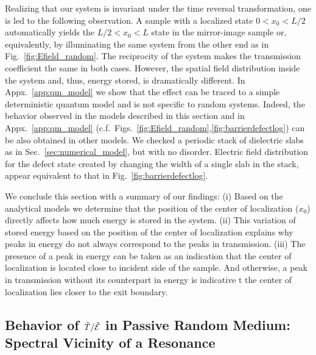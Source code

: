 Realizing that our system is invariant under the time reversal transformation, one is led to the following observation. A sample with a localized state $0<x_0<L/2$ automatically yields the $L/2<x_0<L$ state in the mirror-image sample or, equivalently, by illuminating the same system from the other end as in Fig.~\ref{fig:Efield_random}. The reciprocity of the system makes the transmission coefficient the same in both cases. However, the spatial field distribution inside the system and, thus, energy stored, is dramatically different. In Appx.~\ref{app:qm_model} we show that the effect can be traced to a simple deterministic quantum model and is not specific to random systems. Indeed, the behavior observed in the models described in this section and in Appx.~\ref{app:qm_model} (c.f.~Figs.~\ref{fig:Efield_random},\ref{fig:barrierdefectlog}) can be also obtained in  other models. We checked a periodic stack of dielectric slabs as in Sec.~\ref{sec:numerical_model}, but with no disorder. Electric field distribution for the defect state created by changing the width of a single slab in the stack, appear equivalent to that in Fig.~\ref{fig:barrierdefectlog}.
 
We conclude this section with a summary of our findings: (i) Based on the analytical models we determine that the position of the center of localization ($x_0$) directly affects how much energy is stored in the system. (ii) This variation of stored energy based on the position of the center of localization explains why peaks in energy do not always correspond to the peaks in transmission. (iii) The presence of a peak in energy can be taken as an indication that the center of localization is located close to incident side of the sample. And otherwise, a peak in transmission without its counterpart in energy is indicative t the center of localization lies closer to the exit boundary.

\subsection{Behavior of \texorpdfstring{$\tilde{T}/\tilde{\cal E}$}{T/E} in Passive Random Medium: Spectral Vicinity of a Resonance}
\label{sec:spectral_te}



